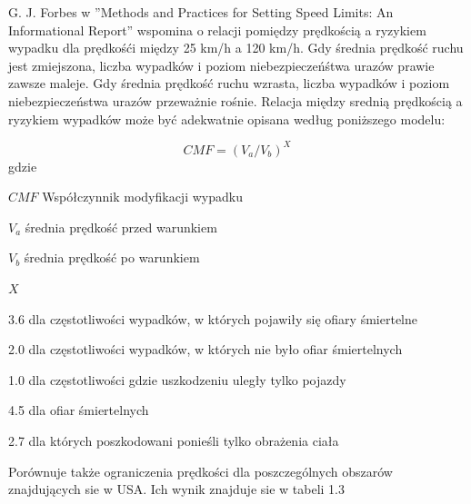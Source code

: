 G. J. Forbes w ''Methods and Practices for Setting Speed Limits: An Informational Report'' wspomina o relacji pomiędzy prędkością a ryzykiem wypadku dla prędkośći między 25 km/h a 120 km/h. Gdy średnia prędkość ruchu jest zmiejszona, liczba wypadków i  poziom niebezpieczeńśtwa urazów prawie zawsze maleje. Gdy średnia prędkość ruchu wzrasta, liczba wypadków i poziom niebezpieczeństwa urazów  przeważnie rośnie. Relacja między srednią prędkością a ryzykiem wypadków może być adekwatnie opisana według poniższego modelu:

\begin{equation}
CMF = (V_a / V_b)^X
\end{equation}
gdzie
\begin{eqwhere}[2cm]
	\item[$CMF$] Współczynnik modyfikacji wypadku
	\item[$V_a$] średnia prędkość przed warunkiem
	\item[$V_b$] średnia prędkość po warunkiem
	\item[$X$] \begin{itemize}
		3.6 dla częstotliwości wypadków, w których pojawiły się ofiary śmiertelne
		
		2.0 dla częstotliwości wypadków, w których nie było ofiar śmiertelnych
		
		1.0 dla częstotliwości gdzie uszkodzeniu uległy tylko pojazdy
		
		4.5 dla ofiar śmiertelnych
		
		2.7 dla których poszkodowani ponieśli tylko obrażenia ciała
	\end{itemize}

\end{eqwhere}
Porównuje także ograniczenia prędkości dla poszczególnych obszarów znajdujących sie w USA. Ich wynik znajduje sie w tabeli 1.3

